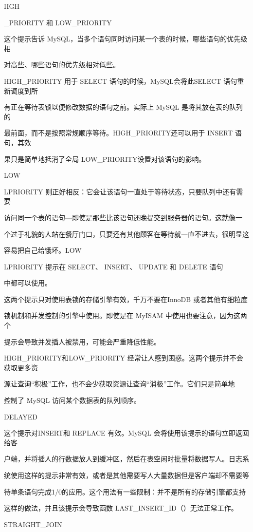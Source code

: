 IIGH

\_PRIORITY 和 LOW\_PRIORITY

这个提示告诉 MySQL，当多个语句同时访问某一个表的时候，哪些语句的优先级相

对高些、哪些语句的优先级相对低些。

HIGH\_PRIORITY 用于 SELECT 语句的时候，MySQL会将此SELECT 语句重新调度到所

有正在等待表锁以便修改数据的语句之前。实际上 MySQL 是将其放在表的队列的

最前面，而不是按照常规顺序等待。HIGH\_PRIORITY还可以用于 INSERT 语句，其效

果只是简单地抵消了全局 LOW\_PRIORITY设置对该语句的影响。

LOW

LPRIORITY 则正好相反：它会让该语句一直处于等待状态，只要队列中还有需要

访问同一个表的语句—即使是那些比该语句还晚提交到服务器的语句。这就像一

个过于礼貌的人站在餐厅门口，只要还有其他顾客在等待就一直不进去，很明显这

容易把自己给饿坏。LOW

LPRIORITY 提示在 SELECT、 INSERT、 UPDATE 和 DELETE 语句

中都可以使用。

这两个提示只对使用表锁的存储引擎有效，千万不要在InnoDB 或者其他有细粒度

锁机制和并发控制的引擎中使用。即使是在 MyISAM 中使用也要注意，因为这两个

提示会导致并发插人被禁用，可能会严重降低性能。

HIGH\_PRIORITY和LOW\_PRIORITY 经常让人感到困惑。这两个提示并不会获取更多资

源让查询“积极”工作，也不会少获取资源让查询“消极”工作。它们只是简单地

控制了 MySQL 访问某个数据表的队列顺序。

DELAYED

这个提示对INSERT和 REPLACE 有效。MySQL 会将使用该提示的语句立即返回给客

户端，并将插人的行数据放人到缓冲区，然后在表空闲时批量将数据写人。日志系

统使用这样的提示非常有效，或者是其他需要写人大量数据但是客户端却不需要等

待单条语句完成1/0的应用。这个用法有一些限制：并不是所有的存储引擎都支持

这样的做法，并且该提示会导致函数 LAST\_INSERT\_ID（）无法正常工作。

STRAIGHT\_JOIN

